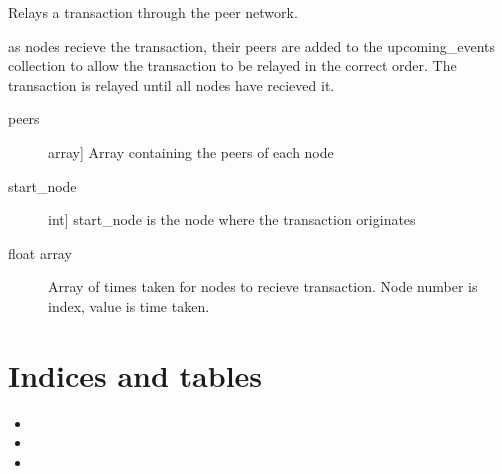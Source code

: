 \documentclass[letterpaper,10pt,english]{sphinxmanual}
\begin{document}
\begin{fulllineitems}
\label{\detokenize{index:propagation_time.relay_single_transaction}}
Relays a transaction through the peer network.

as nodes recieve the transaction, their peers are added to the upcoming\_events collection
to allow the transaction to be relayed in the correct order. The transaction is relayed until all nodes 
have recieved it.
\begin{description}
\item[{peers}] \leavevmode{[}array{]}
Array containing the peers of each node

\item[{start\_node}] \leavevmode{[}int{]}
start\_node is the node where the transaction originates

\end{description}
\begin{description}
\item[{float array}] \leavevmode
Array of times taken for nodes to recieve transaction. Node number is index, value is time taken.

\end{description}

\end{fulllineitems}



\chapter{Indices and tables}
\label{\detokenize{index:indices-and-tables}}\begin{itemize}
\item {} 

\item {} 

\item {} 

\end{itemize}


\renewcommand{\indexname}{Python Module Index}
\begin{sphinxtheindex}
\let\bigletter\sphinxstyleindexlettergroup
\bigletter{p}
\item\relax{}
\end{sphinxtheindex}

\renewcommand{\indexname}{Index}
\printindex
\end{document}
